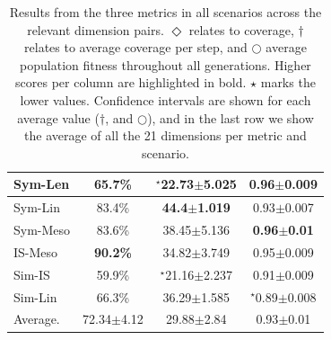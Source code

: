 \begin{table}[t!]
{\begin{tabular}{|l|ccc|}
Sym-Len    & 65.7\%                          & $^{\star}${22.73$\pm$5.025}    & \textbf{0.96$\pm$0.009}    \\ \hline
Sym-Lin    & 83.4\%                          & \textbf{44.4$\pm$1.019}        & 0.93$\pm$0.007             \\ \hline
Sym-Meso   & 83.6\%                          & 38.45$\pm$5.136                & \textbf{0.96$\pm$0.01}     \\ \hline
IS-Meso    & \textbf{90.2\%}                 & 34.82$\pm$3.749                & 0.95$\pm$0.009             \\ \hline
Sim-IS     & 59.9\%                          & $^{\star}${21.16$\pm$2.237}    & 0.91$\pm$0.009             \\ \hline
Sim-Lin    & 66.3\%                          & 36.29$\pm$1.585                & $^{\star}${0.89$\pm$0.008} \\ \hline
Average.   & 72.34$\pm$4.12                  & 29.88$\pm$2.84                 & 0.93$\pm$0.01              \\ \hline
\end{tabular}%
}
\caption{Results from the three metrics in all scenarios across the relevant dimension pairs. $\Diamond$ relates to coverage, $\dagger$ relates to average coverage per step, and $\bigcirc$ average population fitness throughout all generations. Higher scores per column are highlighted in bold. $\star$ marks the lower values. Confidence intervals are shown for each average value ($\dagger$, and $\bigcirc$), and in the last row we show the average of all the 21 dimensions per metric and scenario.}
\label{tab:resultsTable}
\end{table}

